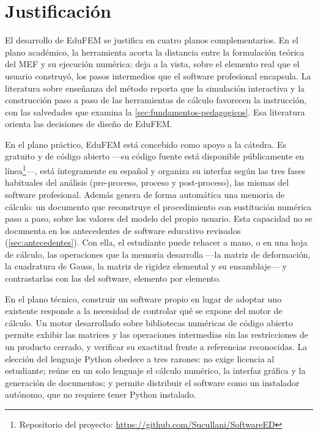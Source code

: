 \section*{Justificación}

El desarrollo de EduFEM se justifica en cuatro planos complementarios. En el plano académico, la herramienta acorta la distancia entre la formulación teórica del MEF y su ejecución numérica: deja a la vista, sobre el elemento real que el usuario construyó, los pasos intermedios que el software profesional encapsula. La literatura sobre enseñanza del método reporta que la simulación interactiva y la construcción paso a paso de las herramientas de cálculo favorecen la instrucción, con las salvedades que examina la \autoref{sec:fundamentos-pedagogicos}. Esa literatura orienta las decisiones de diseño de EduFEM.

En el plano práctico, EduFEM está concebido como apoyo a la cátedra. Es gratuito y de código abierto —su código fuente está disponible públicamente en línea\footnote{Repositorio del proyecto: \url{https://github.com/Sucullani/SoftwareED}}—, está íntegramente en español y organiza su interfaz según las tres fases habituales del análisis (pre-proceso, proceso y post-proceso), las mismas del software profesional. Además genera de forma automática una memoria de cálculo: un documento que reconstruye el procedimiento con sustitución numérica paso a paso, sobre los valores del modelo del propio usuario. Esta capacidad no se documenta en los antecedentes de software educativo revisados (\autoref{sec:antecedentes}). Con ella, el estudiante puede rehacer a mano, o en una hoja de cálculo, las operaciones que la memoria desarrolla —la matriz de deformación, la cuadratura de Gauss, la matriz de rigidez elemental y su ensamblaje— y contrastarlas con las del software, elemento por elemento.

En el plano técnico, construir un software propio en lugar de adoptar uno existente responde a la necesidad de controlar qué se expone del motor de cálculo. Un motor desarrollado sobre bibliotecas numéricas de código abierto \autocite{harris2020numpy,virtanen2020scipy} permite exhibir las matrices y las operaciones intermedias sin las restricciones de un producto cerrado, y verificar su exactitud frente a referencias reconocidas. La elección del lenguaje Python obedece a tres razones: no exige licencia al estudiante; reúne en un solo lenguaje el cálculo numérico, la interfaz gráfica y la generación de documentos; y permite distribuir el software como un instalador autónomo, que no requiere tener Python instalado.

